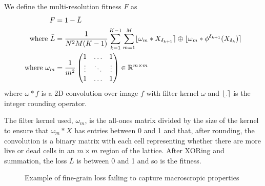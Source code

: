 \begin{definition}
We define the multi-resolution fitness $F$ as
\begin{align*}
    F &= 1 - \bar{L}\\
    \textnormal{where\ } \bar{L} &= \frac{1}{N^2M(K-1)} \sum_{k=1}^{K-1} \sum_{m=1}^{M} \lfloor\omega_m \ast X_{\delta_{k+1}}\rceil \oplus \lfloor\omega_m \ast \phi^{\delta_{k+1}}(X_{\delta_k})\rceil\\
    \textnormal{where\ } \omega_m &= \frac{1}{m^2}
    \begin{pmatrix}
        1 & \ldots & 1\\
        \vdots & \ddots & \vdots\\
        1 & \ldots & 1\\
    \end{pmatrix}
    \in \mathbb{R}^{m \times m}
\end{align*}
where $\omega \ast f$ is a 2D convolution over image $f$ with filter kernel $\omega$ and $\lfloor.\rceil$ is the integer rounding operator.
\end{definition}

The filter kernel used, $\omega_m$, is the all-ones matrix divided by the size of the kernel to ensure that $\omega_m \ast X$ has entries between 0 and 1 and that, after rounding, the convolution is a binary matrix with each cell representing whether there are more live or dead cells in an $m \times m$ region of the lattice. After XORing and summation, the loss $\bar{L}$ is between 0 and 1 and so is the fitness.

\begin{figure}[!h]
\centering
            \hfill
            \hfill
            \hfill
            \hfill
            \hfill
            \caption{Example of fine-grain loss failing to capture macroscropic properties}
\label{fig:singleres-fail}
\end{figure}


